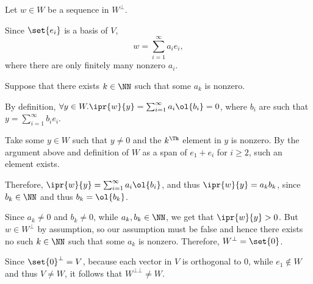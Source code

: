 \documentclass[11pt]{scrartcl}
\begin{document}
Let \(w\in W\) be a sequence in \(W^{\bot}\).

Since \(\set{e_i}\) is a basis of \(V\), 
\[w = \sum_{i=1}^{\infty}a_ie_{i},\]
where there are only finitely many nonzero \(a_i\).

Suppose that there exists \(k\in \NN\) such that some \(a_k\) is nonzero.

By definition, \(\forall y\in W.\ipr{w}{y} = \sum_{i=1}^{\infty}a_i\ol{b_{i}}=0\), where \(b_i\) are such that \(y = \sum_{i=1}^{\infty}b_ie_i\).

Take some \(y\in W\) such that \(y\neq 0\) and the \(k^{\Th}\) element in \(y\) is nonzero. By the argument above and definition of \(W\) as a span of \(e_1+e_i\) for \(i\geq 2\), such an element exists. 

Therefore, \(\ipr{w}{y} = \sum_{i=1}^{\infty}a_i\ol{b_{i}}\), and thus
\(\ipr{w}{y} = a_k b_{k}\), since \(b_k\in \NN\) and thus \(b_k=\ol{b_k}\). 

Since \(a_k\neq 0\) and \(b_k\neq 0\), while \(a_k, b_k\in\NN\), we get that
\(\ipr{w}{y} > 0\). But \(w\in W^{\bot}\) by assumption, so our assumption must be false and hence there exists no such \(k\in \NN\) such that some \(a_k\) is nonzero. Therefore, \(W^{\bot}=\set{0}\).

Since \(\set{0}^{\bot} = V\), because each vector in \(V\) is orthogonal to \(0\), while \(e_1\not\in W\) and thus \(V\neq W\), it follows that \(W^{\bot\bot}\neq W\).
\end{document}
